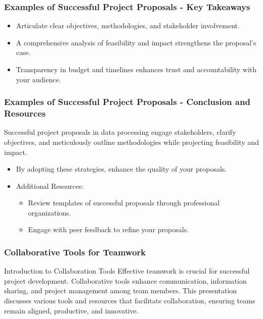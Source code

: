 \documentclass[aspectratio=169]{beamer}
\begin{document}
\begin{frame}[fragile]
    \frametitle{Examples of Successful Project Proposals - Key Takeaways}
    \begin{itemize}
        \item Articulate clear objectives, methodologies, and stakeholder involvement.
        \item A comprehensive analysis of feasibility and impact strengthens the proposal's case.
        \item Transparency in budget and timelines enhances trust and accountability with your audience.
    \end{itemize}
\end{frame}

\begin{frame}[fragile]
    \frametitle{Examples of Successful Project Proposals - Conclusion and Resources}
    Successful project proposals in data processing engage stakeholders, clarify objectives, and meticulously outline methodologies while projecting feasibility and impact.
    \begin{itemize}
        \item By adopting these strategies, enhance the quality of your proposals.
        \item Additional Resources:
        \begin{itemize}
            \item Review templates of successful proposals through professional organizations.
            \item Engage with peer feedback to refine your proposals.
        \end{itemize}
    \end{itemize}
\end{frame}

\begin{frame}[fragile]
    \frametitle{Collaborative Tools for Teamwork}
    \begin{block}{Introduction to Collaboration Tools}
        Effective teamwork is crucial for successful project development. Collaborative tools enhance communication, information sharing, and project management among team members. This presentation discusses various tools and resources that facilitate collaboration, ensuring teams remain aligned, productive, and innovative.
    \end{block}
\end{frame}
\end{document}
